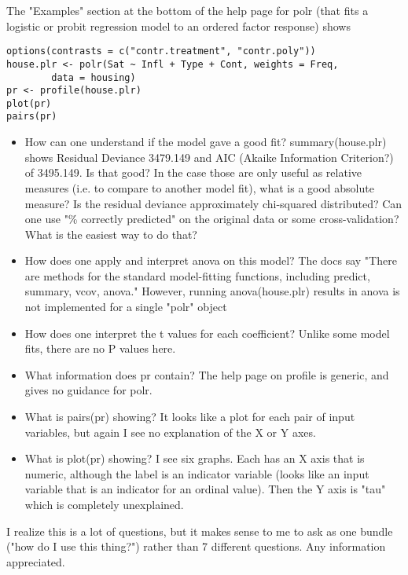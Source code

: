 \documentclass[a4paper,12pt]{article}
\begin{document}
The "Examples" section at the bottom of the help page for polr (that fits a logistic or probit regression model to an ordered factor response) shows
\begin{verbatim}
options(contrasts = c("contr.treatment", "contr.poly"))
house.plr <- polr(Sat ~ Infl + Type + Cont, weights = Freq, 
        data = housing)
pr <- profile(house.plr)
plot(pr)
pairs(pr) 
\end{verbatim}

\begin{itemize}	
\item	How can one understand if the model gave a good fit? summary(house.plr) shows Residual Deviance 3479.149 and AIC (Akaike Information Criterion?) of 3495.149. Is that good? In the case those are only useful as relative measures (i.e. to compare to another model fit), what is a good absolute measure? Is the residual deviance approximately chi-squared distributed? Can one use "\% correctly predicted" on the original data or some cross-validation? What is the easiest way to do that?
\item	How does one apply and interpret anova on this model? The docs say "There are methods for the standard model-fitting functions, including predict, summary, vcov, anova." However, running anova(house.plr) results in anova is not implemented for a single "polr" object
\item	How does one interpret the t values for each coefficient? Unlike some model fits, there are no P values here.
\item	What information does pr contain? The help page on profile is generic, and gives no guidance for polr.
\item	What is pairs(pr) showing? It looks like a plot for each pair of input variables, but again I see no explanation of the X or Y axes.
\item	What is plot(pr) showing? I see six graphs. Each has an X axis that is numeric, although the label is an indicator variable (looks like an input variable that is an indicator for an ordinal value). Then the Y axis is "tau" which is completely unexplained.
\end{itemize}	


 
I realize this is a lot of questions, but it makes sense to me to ask as one bundle ("how do I use this thing?") rather than 7 different questions. Any information appreciated.
\end{document}
